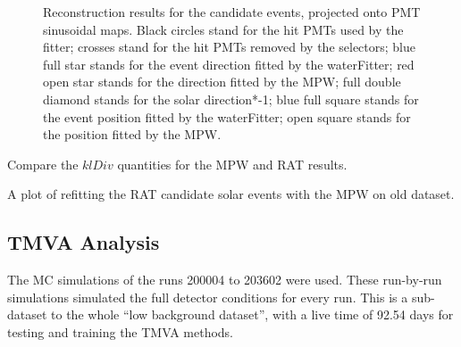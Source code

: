 \begin{figure}[htbp]
{\begin{minipage}[t]{0.4\textwidth}
		\end{minipage}
	}
	\caption[Reconstruction results for the candidate events, projected onto PMT sinusoidal maps.]{Reconstruction results for the candidate events, projected onto PMT sinusoidal maps. Black circles stand for
		the hit PMTs used by the fitter; crosses stand for the hit PMTs removed by the selectors; blue full star stands for the event direction fitted by the waterFitter; red open star stands for the direction fitted by the MPW; full double diamond stands for the solar direction*-1; blue full square stands for the event position fitted by the waterFitter; open square stands for the position fitted by the MPW.}
	\label{openDataSetCandidate}
\end{figure}

Compare the $klDiv$ quantities for the MPW and RAT results. 

A plot of refitting the RAT candidate solar events with the MPW on old dataset.

\subsection{TMVA Analysis}\label{sect:tmva}
The MC simulations of the runs 200004 to 203602 were used. These run-by-run simulations simulated the full detector conditions for every run. This is a sub-dataset to the whole ``low background dataset'', with a live time of 92.54 days for testing and training the TMVA methods.

